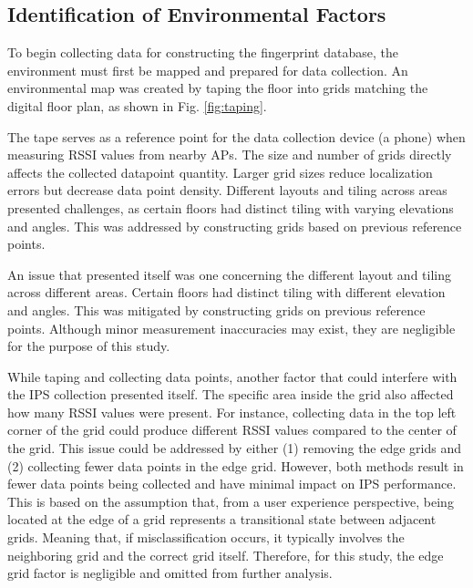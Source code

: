 \documentclass[runningheads]{llncs}
\begin{document}
\subsection{Identification of Environmental Factors}
To begin collecting data for constructing the fingerprint database, the environment must first be mapped and prepared for data collection. An environmental map was created by taping the floor into grids matching the digital floor plan, as shown in Fig. \ref{fig:taping}. 

The tape serves as a reference point for the data collection device (a phone) when measuring RSSI values from nearby APs. The size and number of grids directly affects the collected datapoint quantity. Larger grid sizes reduce localization errors but decrease data point density. Different layouts and tiling across areas presented challenges, as certain floors had distinct tiling with varying elevations and angles. This was addressed by constructing grids based on previous reference points. 


An issue that presented itself was one concerning the different layout and tiling across different areas. Certain floors had distinct tiling with different elevation and angles. This was mitigated by constructing grids on previous reference points. Although minor measurement inaccuracies may exist, they are negligible for the purpose of this study.

While taping and collecting data points, another factor that could interfere with the IPS collection presented itself. The specific area inside the grid also affected how many RSSI values were present. For instance, collecting data in the top left corner of the grid could produce different RSSI values compared to the center of the grid. This issue could be addressed by either (1) removing the edge grids and (2) collecting fewer data points in the edge grid. However, both methods result in fewer data points being collected and have minimal impact on IPS performance. This is based on the assumption that, from a user experience perspective, being located at the edge of a grid represents a transitional state between adjacent grids. Meaning that, if misclassification occurs, it typically involves the neighboring grid and the correct grid itself. Therefore, for this study, the edge grid factor is negligible and omitted from further analysis.
\end{document}
